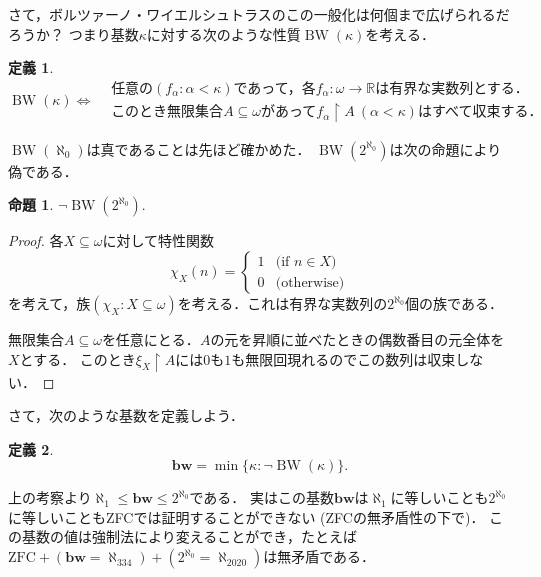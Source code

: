 \documentclass[uplatex,dvipdfmx]{jsarticle}
\newcommand{\R}{\mathbb{R}}
\renewcommand\subset{\subseteq}
\newcommand{\BW}{\operatorname{BW}}
\theoremstyle{definition}
\newtheorem*{defi*}{定義}
\newtheorem*{prop*}{命題}
\theoremstyle{named}
\begin{document}
さて，ボルツァーノ・ワイエルシュトラスのこの一般化は何個まで広げられるだろうか？
つまり基数$\kappa$に対する次のような性質$\BW(\kappa)$を考える．


\begin{framed}
\begin{defi*}
\[
\BW(\kappa) \iff \begin{aligned}
&\text{任意の$(f_\alpha : \alpha < \kappa)$であって，各$f_\alpha: \omega \to \R$は有界な実数列とする．} \\
&\text{このとき無限集合$A \subset \omega$があって$f_\alpha \upharpoonright A \ (\alpha < \kappa)$はすべて収束する．}
\end{aligned}
\]
\end{defi*}
\end{framed}

$\BW(\aleph_0)$は真であることは先ほど確かめた．
$\BW(2^{\aleph_0})$は次の命題により偽である．

\begin{framed}
\begin{prop*}
$\neg \BW(2^{\aleph_0})$.
\end{prop*}
\end{framed}
\begin{proof}
各$X \subset \omega$に対して特性関数
\[
\chi_X(n) = \begin{cases} 1 & \text{(if $n \in X$)} \\ 0 & \text{(otherwise)} \end{cases}
\]
を考えて，族$(\chi_X : X \subset \omega)$を考える．これは有界な実数列の$2^{\aleph_0}$個の族である．

無限集合$A \subset \omega$を任意にとる．$A$の元を昇順に並べたときの偶数番目の元全体を$X$とする．
このとき$\xi_X \upharpoonright A$には$0$も$1$も無限回現れるのでこの数列は収束しない．
\end{proof}

さて，次のような基数を定義しよう．

\begin{framed}
\begin{defi*}
\[
\mathbf{bw} = \min \{ \kappa : \neg \BW(\kappa) \}.
\]
\end{defi*}
\end{framed}

上の考察より$\aleph_1 \le \mathbf{bw} \le 2^{\aleph_0}$である．
実はこの基数$\mathbf{bw}$は$\aleph_1$に等しいことも$2^{\aleph_0}$に等しいこともZFCでは証明することができない (ZFCの無矛盾性の下で)．
この基数の値は強制法により変えることができ，たとえば$\mathrm{ZFC} + (\mathbf{bw} = \aleph_{334}) + (2^{\aleph_0} = \aleph_{2020})$は無矛盾である．
\end{document}
